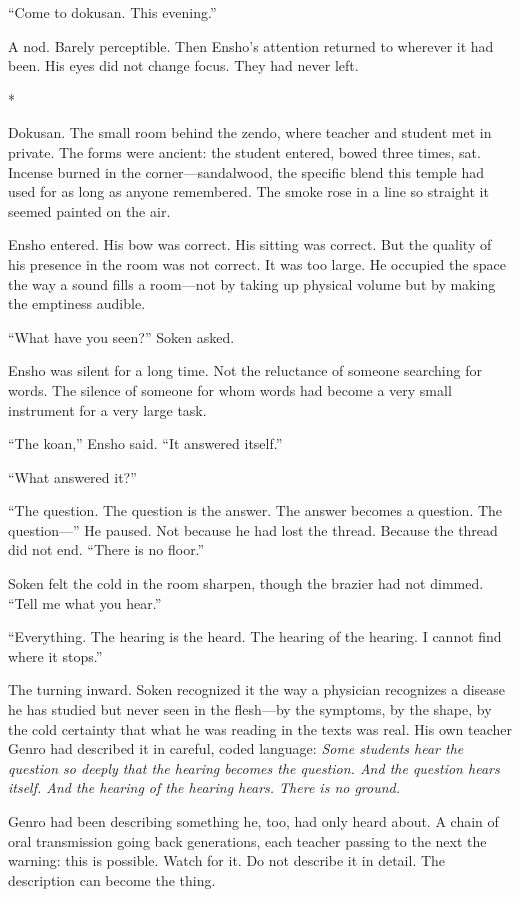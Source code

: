 ``Come to dokusan. This evening.''

A nod. Barely perceptible. Then Ensho's attention returned to wherever it had been. His eyes did not change focus. They had never left.

\begin{center}
*\quad*\quad*
\end{center}

Dokusan. The small room behind the zendo, where teacher and student met in private. The forms were ancient: the student entered, bowed three times, sat. Incense burned in the corner---sandalwood, the specific blend this temple had used for as long as anyone remembered. The smoke rose in a line so straight it seemed painted on the air.

Ensho entered. His bow was correct. His sitting was correct. But the quality of his presence in the room was not correct. It was too large. He occupied the space the way a sound fills a room---not by taking up physical volume but by making the emptiness audible.

``What have you seen?'' Soken asked.

Ensho was silent for a long time. Not the reluctance of someone searching for words. The silence of someone for whom words had become a very small instrument for a very large task.

``The koan,'' Ensho said. ``It answered itself.''

``What answered it?''

``The question. The question is the answer. The answer becomes a question. The question---'' He paused. Not because he had lost the thread. Because the thread did not end. ``There is no floor.''

Soken felt the cold in the room sharpen, though the brazier had not dimmed. ``Tell me what you hear.''

``Everything. The hearing is the heard. The hearing of the hearing. I cannot find where it stops.''

The turning inward. Soken recognized it the way a physician recognizes a disease he has studied but never seen in the flesh---by the symptoms, by the shape, by the cold certainty that what he was reading in the texts was real. His own teacher Genro had described it in careful, coded language: \emph{Some students hear the question so deeply that the hearing becomes the question. And the question hears itself. And the hearing of the hearing hears. There is no ground.}

Genro had been describing something he, too, had only heard about. A chain of oral transmission going back generations, each teacher passing to the next the warning: this is possible. Watch for it. Do not describe it in detail. The description can become the thing.

